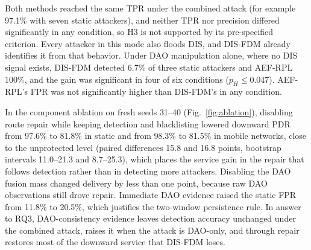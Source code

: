 \begin{table}[t]
\caption{Combined attack with seven attackers (seeds 1--10). Mean $\pm$ 95\% confidence half-width, in percent.}\label{tab:mainresults}
\centering\footnotesize\setlength{\tabcolsep}{4pt}
\end{table}

\begin{table}[t]
\caption{AEF-RPL and DIS-FDM under the combined attack for each attacker count $k$ and topology (S: static, M: 30\% mobile), with the detection latency of the learning and fixed-rule versions. Values are means over ten paired seeds, and $p_H$ is the two-sided Wilcoxon $p$-value after Holm adjustment. The last column gives the number of runs, out of ten, in which downward service stayed at or came back to 90\% of its pre-attack level.}\label{tab:primary}
\centering\footnotesize
\end{table}

Both methods reached the same TPR under the combined attack (for example 97.1\% with seven static attackers), and neither TPR nor precision differed significantly in any condition, so H3 is not supported by its pre-specified criterion. Every attacker in this mode also floods DIS, and DIS-FDM already identifies it from that behavior. Under DAO manipulation alone, where no DIS signal exists, DIS-FDM detected 6.7\% of three static attackers and AEF-RPL 100\%, and the gain was significant in four of six conditions ($p_H\le0.047$). AEF-RPL's FPR was not significantly higher than DIS-FDM's in any condition.

In the component ablation on fresh seeds 31--40 (Fig.~\ref{fig:ablation}), disabling route repair while keeping detection and blacklisting lowered downward PDR from 97.6\% to 81.8\% in static and from 98.3\% to 81.5\% in mobile networks, close to the unprotected level (paired differences 15.8 and 16.8 points, bootstrap intervals 11.0--21.3 and 8.7--25.3), which places the service gain in the repair that follows detection rather than in detecting more attackers. Disabling the DAO fusion mass changed delivery by less than one point, because raw DAO observations still drove repair. Immediate DAO evidence raised the static FPR from 11.8\% to 20.5\%, which justifies the two-window persistence rule. In answer to RQ3, DAO-consistency evidence leaves detection accuracy unchanged under the combined attack, raises it when the attack is DAO-only, and through repair restores most of the downward service that DIS-FDM loses.

